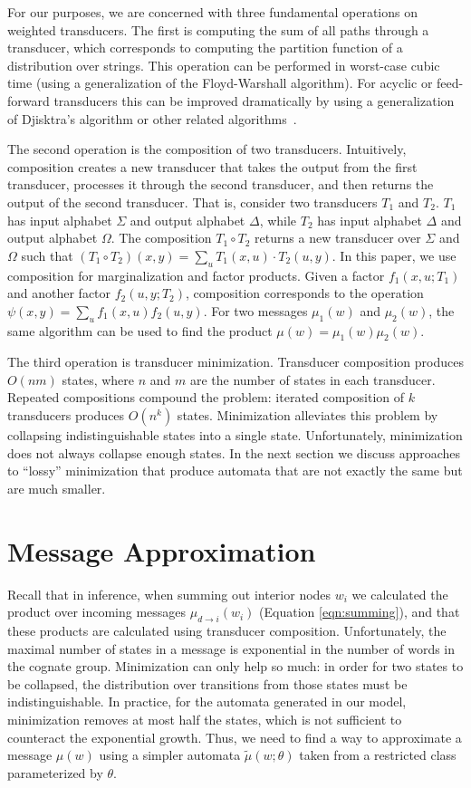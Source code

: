 \documentclass[11pt,a4paper]{article}
\begin{document}
For our purposes, we are concerned with three fundamental operations
on weighted transducers. The first is computing the sum of all paths
through a transducer, which corresponds to computing the partition
function of a distribution over strings. This operation can be
performed in worst-case cubic time (using a generalization of the
Floyd-Warshall algorithm).  For acyclic or feed-forward transducers
this can be improved dramatically by using a generalization of
Djisktra's algorithm or other related algorithms~\cite{mohri09weighted}.

The second operation is the composition of two transducers.
Intuitively, composition creates a new transducer that takes the
output from the first transducer, processes it through the second
transducer, and then returns the output of the second transducer.
That is, consider two transducers $T_1$ and $T_2$. $T_1$ has input
alphabet $\Sigma$ and output alphabet $\Delta$, while $T_2$ has
input alphabet $\Delta$ and output alphabet $\Omega$. The composition
$T_1 \circ T_2$ returns a new transducer over $\Sigma$ and $\Omega$
such that $(T_1 \circ T_2)(x,y) = \sum_{u} T_1(x,u)\cdot T_2(u,y)$.
In this paper, we use composition for marginalization and factor
products. Given a factor $f_1(x,u;T_1)$ and another factor $f_2(u,y;T_2)$,
composition corresponds to the operation $\psi(x,y) = \sum_u f_1(x,u)
f_2(u,y)$. For two messages $\mu_1(w)$ and $\mu_2(w)$, the same
algorithm can be used to find the product $\mu(w) = \mu_1(w)\mu_2(w)$.

The third operation is transducer minimization. Transducer composition
produces $O(nm)$ states, where $n$ and $m$ are the number of states
in each transducer. Repeated compositions compound the problem:
iterated composition of $k$ transducers produces $O(n^k)$ states.
Minimization alleviates this problem by collapsing indistinguishable
states into a single state. Unfortunately, minimization does not
always collapse enough states. In the next section we discuss approaches
to ``lossy'' minimization that produce automata that are not exactly
the same but are much smaller.

\section{Message Approximation}
\label{sec:approx}

Recall that in inference, when summing out interior nodes $w_i$ we
calculated the product over incoming messages $\mu_{d\to i}(w_i)$
(Equation \ref{eqn:summing}), and that these products are calculated
using transducer composition. Unfortunately, the maximal number of
states in a message is exponential in the number of words in the
cognate group. Minimization can only help so much: in order for two
states to be collapsed, the distribution over transitions from those
states must be indistinguishable. In practice, for the automata
generated in our model, minimization removes at most half the states,
which is not sufficient to counteract the exponential growth. Thus,
we need to find a way to approximate a message $\mu(w)$ using a
simpler automata $\tilde\mu(w;\theta)$ taken from a restricted class
parameterized by $\theta$.
\end{document}
